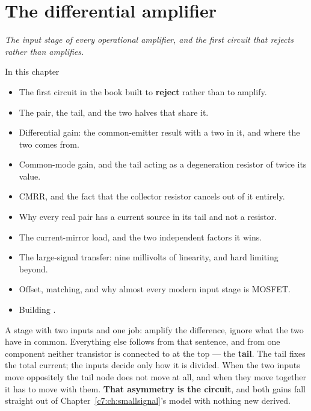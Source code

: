 
\chapter{The differential amplifier}
\label{c9:ch:diffpair}

{\large\itshape The input stage of every operational amplifier, and the first circuit that rejects
rather than amplifies.\par}

\begin{chapterbox}{In this chapter}
\begin{itemize}
  \item The first circuit in the book built to \textbf{reject} rather than to amplify.
  \item The pair, the tail, and the two halves that share it.
  \item Differential gain: the common-emitter result with a two in it, and where the two comes
    from.
  \item Common-mode gain, and the tail acting as a degeneration resistor of twice its value.
  \item CMRR, and the fact that the collector resistor cancels out of it entirely.
  \item Why every real pair has a current source in its tail and not a resistor.
  \item The current-mirror load, and the two independent factors it wins.
  \item The large-signal transfer: nine millivolts of linearity, and hard limiting beyond.
  \item Offset, matching, and why almost every modern input stage is MOSFET.
  \item Building .
\end{itemize}
\end{chapterbox}

A stage with two inputs and one job: amplify the difference, ignore what the two have in common.
Everything else follows from that sentence, and from one component neither transistor is connected
to at the top --- the \textbf{tail}. The tail fixes the total current; the inputs decide only how it
is divided. When the two inputs move oppositely the tail node does not move at all, and when they
move together it has to move with them. \textbf{That asymmetry is the circuit}, and both gains fall
straight out of Chapter~\ref{c7:ch:smallsignal}'s model with nothing new derived.


